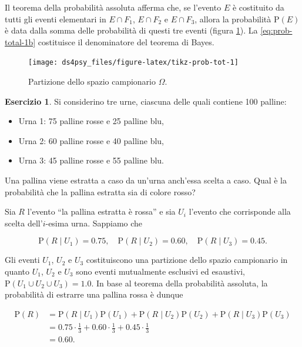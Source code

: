 \documentclass[
  11pt,
]{krantz}
\providecommand{\tightlist}{%
  \setlength{\itemsep}{0pt}\setlength{\parskip}{0pt}}
\theoremstyle{definition}
\theoremstyle{definition}
\theoremstyle{definition}
\newtheorem{exercise}{Esercizio}[chapter]
\theoremstyle{definition}
\theoremstyle{remark}
\begin{document}
Il teorema della probabilità assoluta afferma che, se l'evento \(E\) è costituito da tutti gli eventi elementari in \(E \cap F_1\), \(E \cap F_2\) e \(E \cap F_3\), allora la probabilità \({\mbox{P}}(E)\) è data dalla somma delle probabilità di questi tre eventi (figura \ref{fig:tikz-prob-tot}). La \eqref{eq:prob-total-1b} costituisce il denominatore del teorema di Bayes.

\begin{figure}[h]

{\centering \texttt{[image: ds4psy\_files/figure-latex/tikz-prob-tot-1]} 

}

\caption{Partizione dello spazio campionario $\Omega$.}\label{fig:tikz-prob-tot}
\end{figure}

\begin{exercise}
Si considerino tre urne, ciascuna delle quali contiene 100 palline:

\begin{itemize}
\tightlist
\item
  Urna 1: 75 palline rosse e 25 palline blu,
\item
  Urna 2: 60 palline rosse e 40 palline blu,
\item
  Urna 3: 45 palline rosse e 55 palline blu.
\end{itemize}

\noindent Una pallina viene estratta a caso da un'urna anch'essa scelta a caso. Qual è la probabilità che la pallina estratta sia di colore rosso?

Sia \(R\) l'evento ``la pallina estratta è rossa'' e sia \(U_i\) l'evento che corrisponde alla scelta dell'\(i\)-esima urna. Sappiamo che

\[
{\mbox{P}}(R \mid U_1) = 0.75, \quad {\mbox{P}}(R \mid U_2) = 0.60, \quad {\mbox{P}}(R \mid U_3) = 0.45.
\]

Gli eventi \(U_1\), \(U_2\) e \(U_3\) costituiscono una partizione dello spazio campionario in quanto \(U_1\), \(U_2\) e \(U_3\) sono eventi mutualmente esclusivi ed esaustivi, \({\mbox{P}}(U_1 \cup U_2 \cup U_3) = 1.0\). In base al teorema della probabilità assoluta, la probabilità di estrarre una pallina rossa è dunque

\[
\begin{split}
{\mbox{P}}(R) &= {\mbox{P}}(R \mid U_1){\mbox{P}}(U_1)+{\mbox{P}}(R \mid U_2){\mbox{P}}(U_2)+{\mbox{P}}(R \mid U_3){\mbox{P}}(U_3) \\
&= 0.75 \cdot \frac{1}{3}+0.60 \cdot \frac{1}{3}+0.45 \cdot \frac{1}{3} \\
&=0.60.
\end{split}
\]
\end{exercise}
\end{document}
